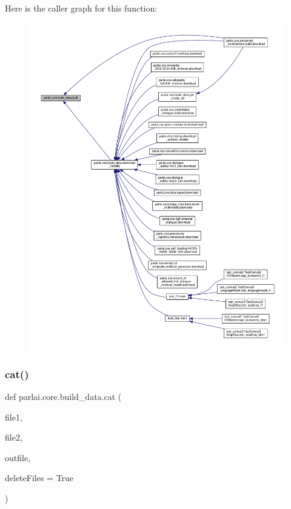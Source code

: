 Here is the caller graph for this function\+:
\nopagebreak
\begin{figure}[H]
\begin{center}
\leavevmode
\includegraphics[width=350pt]{namespaceparlai_1_1core_1_1build__data_ad834e1a9be02e18a6c2de2b03b9a8f10_icgraph}
\end{center}
\end{figure}
\mbox{\label{namespaceparlai_1_1core_1_1build__data_adc4feba864e2a0d0663cdf6bf84afaf6}} 
\subsubsection{\texorpdfstring{cat()}{cat()}}
{\footnotesize\ttfamily def parlai.\+core.\+build\+\_\+data.\+cat (\begin{DoxyParamCaption}\item[{}]{file1,  }\item[{}]{file2,  }\item[{}]{outfile,  }\item[{}]{delete\+Files = {\ttfamily True} }\end{DoxyParamCaption})}

